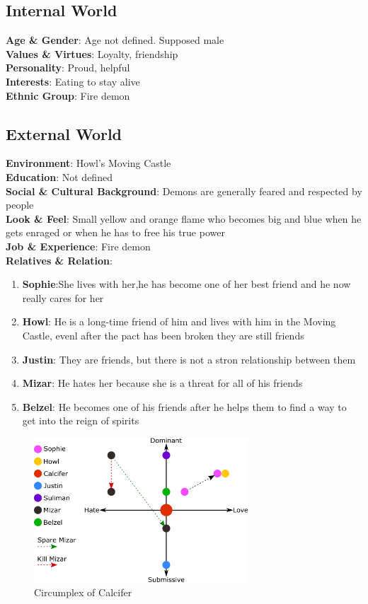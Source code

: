 \subsection{Internal World}

\textbf{Age \& Gender}: Age not defined. Supposed male \\
\textbf{Values \& Virtues}: Loyalty, friendship\\
\textbf{Personality}: Proud, helpful \\
\textbf{Interests}: Eating to stay alive\\
\textbf{Ethnic Group}: Fire demon

\subsection{External World}
\textbf{Environment}: Howl’s Moving Castle \\
\textbf{Education}: Not defined \\
\textbf{Social \& Cultural Background}: Demons are generally feared and respected by people \\
\textbf{Look \& Feel}: Small yellow and orange flame who becomes big and  blue when he gets enraged or when he has to free his true power\\
\textbf{Job \& Experience}: Fire demon \\
\textbf{Relatives \& Relation}:
\begin{enumerate}
\item \textbf{Sophie}:She lives with her,he has become one of her best friend and he now really cares for her
\item \textbf{Howl}: He is a long-time friend of him and lives with him in the Moving Castle, evenl after the pact has been broken they are still friends
\item \textbf{Justin}: They are friends, but there is not a stron relationship between them
\item \textbf{Mizar}: He hates her because she is a threat for all of his friends
\item \textbf{Belzel}: He becomes one of his friends after he helps them to find a way to get into the reign of spirits
\end{enumerate}

\begin{figure}
  \centering
  \includegraphics[width=8cm]{Images/Circumplexes/calciferCircumplex}
  \caption{Circumplex of Calcifer}
\end{figure}

